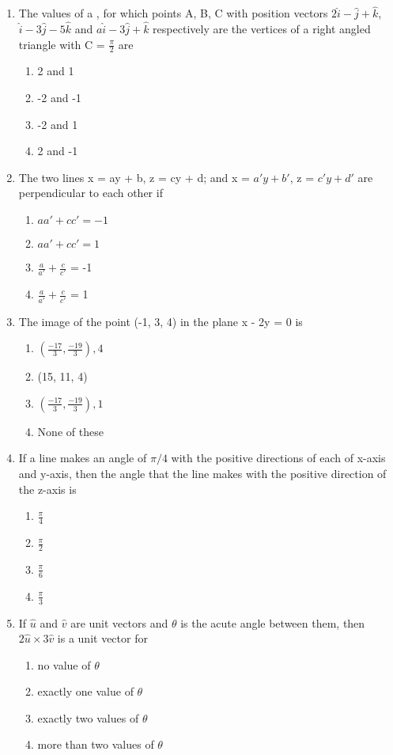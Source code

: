 \begin{enumerate}[label=\arabic*.,ref=\thesubsection.\theenumi]
\item The values of a , for which points A, B, C with position vectors $2\hat{i} - \hat{j} + \hat{k}$, 
$\hat{i} - 3\hat{j} - 5\hat{k}$ and $a\hat{i} - 3\hat{j} + \hat{k}$ respectively are the vertices of a right angled triangle with C = $\frac{\pi}{2}$ are
\begin{enumerate}
\item 2 and 1
\item -2 and -1
\item -2 and 1
\item 2 and -1
\end{enumerate}

\item The two lines x = ay + b, z = cy + d; and x = $a'y + b'$, z = $c'y + d'$ are perpendicular to each other if
\begin{enumerate}
\item $aa' + cc' = -1$
\item $aa' + cc' = 1$
\item $\frac{a}{a'} + \frac{c}{c'}$ = -1
\item $\frac{a}{a'} + \frac{c}{c'}$ = 1
\end{enumerate}

\item The image of the point (-1, 3, 4) in the plane x - 2y = 0 is
\begin{enumerate}
\item $(\frac{-17}{3}, \frac{-19}{3}), 4$
\item (15, 11, 4)
\item $(\frac{-17}{3}, \frac{-19}{3}), 1$
\item None of these
\end{enumerate}

\item If a line makes an angle of $\pi/4$ with the positive directions of each of x-axis and y-axis, then the angle that the line makes with the positive direction of the z-axis is
\begin{enumerate}
\item $\frac{\pi}{4}$
\item $\frac{\pi}{2}$
\item $\frac{\pi}{6}$
\item $\frac{\pi}{3}$
\end{enumerate}

\item If $\hat{u}$ and $\hat{v}$ are unit vectors and $\theta$ is the acute angle between them, then $2\hat{u} \times 3\hat{v}$ is a unit vector for
\begin{enumerate}
\item no value of $\theta$
\item exactly one value of $\theta$
\item exactly two values of $\theta$
\item more than two values of $\theta$
\end{enumerate}


\end{enumerate}

